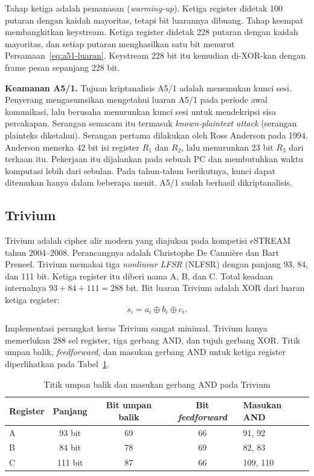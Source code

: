 Tahap ketiga adalah pemanasan (\textit{warming-up}). Ketiga register didetak
100 putaran dengan kaidah mayoritas, tetapi bit luarannya dibuang. Tahap
keempat membangkitkan keystream. Ketiga register didetak 228 putaran dengan
kaidah mayoritas, dan setiap putaran menghasilkan satu bit menurut
Persamaan~\ref{eq:a51-luaran}. Keystream 228 bit itu kemudian di-XOR-kan dengan
frame pesan sepanjang 228 bit.

\textbf{Keamanan A5/1.} Tujuan kriptanalisis A5/1 adalah menemukan kunci sesi.
Penyerang mengasumsikan mengetahui luaran A5/1 pada periode awal komunikasi,
lalu berusaha menurunkan kunci sesi untuk mendekripsi sisa percakapan. Serangan
semacam itu termasuk \textit{known-plaintext attack} (serangan plainteks
diketahui). Serangan pertama
dilakukan oleh Ross Anderson pada 1994. Anderson menerka 42 bit isi register
$R_1$ dan $R_2$, lalu menurunkan 23 bit $R_3$ dari terkaan itu. Pekerjaan itu
dijalankan pada sebuah PC dan membutuhkan waktu komputasi lebih dari sebulan.
Pada tahun-tahun berikutnya, kunci dapat ditemukan hanya dalam beberapa menit.
A5/1 sudah berhasil dikriptanalisis.

\subsection{Trivium}

Trivium adalah cipher alir modern yang diajukan pada kompetisi eSTREAM tahun
2004--2008. Perancangnya adalah Christophe De Cannière dan Bart Preneel.
Trivium memakai tiga \textit{nonlinear LFSR} (NLFSR) dengan panjang 93, 84, dan
111 bit. Ketiga register itu diberi nama A, B, dan C. Total keadaan
internalnya $93 + 84 + 111 = 288$ bit. Bit luaran Trivium adalah XOR dari
luaran ketiga register:
\begin{equation}
s_i = a_i \oplus b_i \oplus c_i .
\label{eq:trivium-luaran}
\end{equation}

Implementasi perangkat keras Trivium sangat minimal. Trivium hanya memerlukan
288 sel register, tiga gerbang AND, dan tujuh gerbang XOR. Titik umpan balik,
\textit{feedforward}, dan masukan gerbang AND untuk ketiga register
diperlihatkan pada Tabel~\ref{tab:trivium-tap}.

\begin{table}[htbp]
\centering
\small
\begin{tabular}{@{}l c c c l@{}}
\hline
\textbf{Register} & \textbf{Panjang} & \textbf{Bit umpan balik} & \textbf{Bit \textit{feedforward}} & \textbf{Masukan AND} \\
\hline
A & 93 bit  & 69 & 66 & 91, 92 \\
B & 84 bit  & 78 & 69 & 82, 83 \\
C & 111 bit & 87 & 66 & 109, 110 \\
\hline
\end{tabular}
\caption{Titik umpan balik dan masukan gerbang AND pada Trivium}
\label{tab:trivium-tap}
\end{table}

